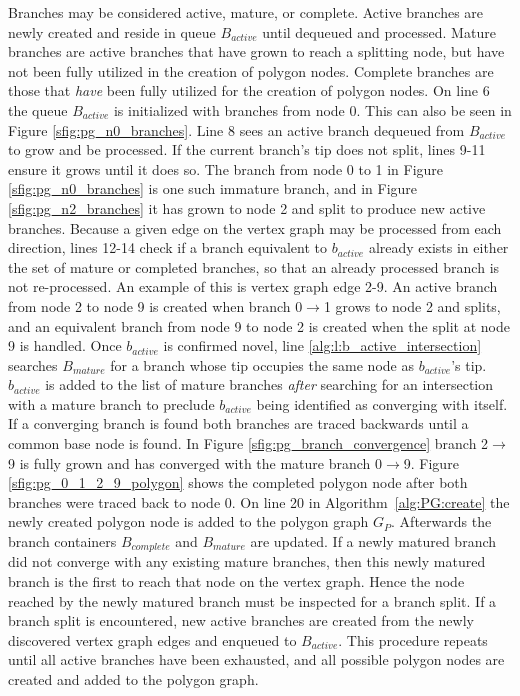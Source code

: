 Branches may be considered active, mature, or complete.
Active branches are newly created and reside in queue $B_{active}$ until dequeued and processed.
Mature branches are active branches that have grown to reach a splitting node, but have not been fully utilized in the creation of polygon nodes.
Complete branches are those that \textit{have} been fully utilized for the creation of polygon nodes.
On line 6 the queue $B_{active}$ is initialized with branches from node 0.
This can also be seen in Figure \ref{sfig:pg_n0_branches}.
Line 8 sees an active branch dequeued from $B_{active}$ to grow and be processed.
If the current branch's tip does not split, lines 9-11 ensure it grows until it does so.
The branch from node 0 to 1 in Figure \ref{sfig:pg_n0_branches} is one such immature branch, and in Figure \ref{sfig:pg_n2_branches} it has grown to node 2 and split to produce new active branches.
Because a given edge on the vertex graph may be processed from each direction, lines 12-14 check if a branch equivalent to $b_{active}$ already exists in either the set of mature or completed branches, so that an already processed branch is not re-processed.
An example of this is vertex graph edge 2-9.
An active branch from node 2 to node 9 is created when branch 0$\rightarrow$1 grows to node 2 and splits, and an equivalent branch from node 9 to node 2 is created when the split at node 9 is handled.
Once $b_{active}$ is confirmed novel, line \ref{alg:l:b_active_intersection} searches $B_{mature}$ for a branch whose tip occupies the same node as $b_{active}$'s tip.
$b_{active}$ is added to the list of mature branches \textit{after} searching for an intersection with a mature branch to preclude $b_{active}$ being identified as converging with itself.
If a converging branch is found both branches are traced backwards until a common base node is found.
In Figure \ref{sfig:pg_branch_convergence} branch 2$\rightarrow$9 is fully grown and has converged with the mature branch 0$\rightarrow$9.
Figure \ref{sfig:pg_0_1_2_9_polygon} shows the completed polygon node after both branches were traced back to node 0.
On line 20 in Algorithm~\ref{alg:PG:create} the newly created polygon node is added to the polygon graph $G_P$.
Afterwards the branch containers $B_{complete}$ and $B_{mature}$ are updated.
If a newly matured branch did not converge with any existing mature branches, then this newly matured branch is the first to reach that node on the vertex graph.
Hence the node reached by the newly matured branch must be inspected for a branch split.
If a branch split is encountered, new active branches are created from the newly discovered vertex graph edges and enqueued to $B_{active}$.
This procedure repeats until all active branches have been exhausted, and all possible polygon nodes are created and added to the polygon graph.


